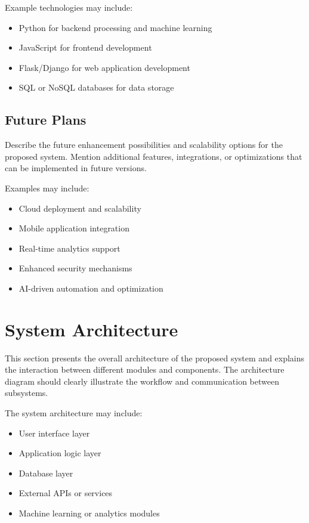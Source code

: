 Example technologies may include:
\begin{itemize}
    \item Python for backend processing and machine learning
    \item JavaScript for frontend development
    \item Flask/Django for web application development
    \item SQL or NoSQL databases for data storage
\end{itemize}


\subsection{Future Plans}

Describe the future enhancement possibilities and scalability options for the proposed system. Mention additional features, integrations, or optimizations that can be implemented in future versions.

Examples may include:
\begin{itemize}
    \item Cloud deployment and scalability
    \item Mobile application integration
    \item Real-time analytics support
    \item Enhanced security mechanisms
    \item AI-driven automation and optimization
\end{itemize}


\section{System Architecture}

This section presents the overall architecture of the proposed system and explains the interaction between different modules and components. The architecture diagram should clearly illustrate the workflow and communication between subsystems.

The system architecture may include:
\begin{itemize}
    \item User interface layer
    \item Application logic layer
    \item Database layer
    \item External APIs or services
    \item Machine learning or analytics modules
\end{itemize}

